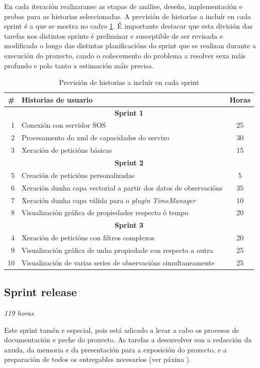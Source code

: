 En cada iteración realizaranse as etapas de análise, deseño, implementación e probas para as historias seleccionadas. A previsión de historias a incluír en cada sprint é a que se mostra no cadro \ref{tab:previsionSprints}. É importante destacar que esta división das tarefas nos distintos sprints é preliminar e susceptible de ser revisada e modificada o longo das distintas planificacións do sprint que se realizan durante a execución do proxecto, cando o coñecemento do problema a resolver sexa máis profundo e polo tanto a estimación máis precisa.

\begin{table}
\centering
\begin{tabularx}{\textwidth}{rXc} \toprule
	\# & Historias de usuario & Horas \\
	\midrule
	\multicolumn{3}{c}{\textbf{Sprint 1}} \\
	1 & Conexión con servidor SOS & 25 \\
	2 & Procesamento do xml de capacidades do servizo & 30 \\
	3 & Xeración de peticións básicas & 15 \\
	\multicolumn{3}{c}{\textbf{Sprint 2}} \\
	5 & Creación de peticións personalizadas & 5 \\
	6 & Xeración dunha capa vectorial a partir dos datos de observacións & 35\\
	7 & Xeración dunha capa válida para o \emph{plugin} \emph{TimeManager} & 10\\
	8 & Visualización gráfica de propiedades respecto ó tempo & 20\\
	\multicolumn{3}{c}{\textbf{Sprint 3}} \\
	4 & Xeración de peticións con filtros complexos & 20 \\
	9 & Visualización gráfica de unha propiedade con respecto a outra & 25\\
	10 & Visualización de varias series de observacións simultaneamente & 25\\
	\bottomrule
\end{tabularx}
\caption{Previsión de historias a incluír en cada sprint}
\label{tab:previsionSprints}
\end{table}

\subsection{Sprint release}
\textit{119 horas}

Este sprint tamén e especial, pois está adicado a levar a cabo os procesos de documentación e peche do proxecto. As tarefas a desenvolver son a redacción da axuda, da memoria e da presentación para a exposición do proxecto, e a preparación de todos os entregables necesarios (ver páxina \pageref{sss:entregables}).

